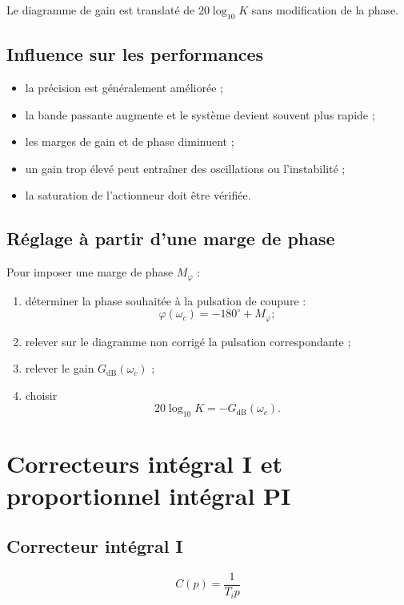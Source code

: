 \TLBodeCorrecteurP[10]

Le diagramme de gain est translaté de $20\log_{10}K$ sans modification de la
phase.

\subsection{Influence sur les performances}

\begin{itemize}
  \item la précision est généralement améliorée ;
  \item la bande passante augmente et le système devient souvent plus rapide ;
  \item les marges de gain et de phase diminuent ;
  \item un gain trop élevé peut entraîner des oscillations ou l'instabilité ;
  \item la saturation de l'actionneur doit être vérifiée.
\end{itemize}

\subsection{Réglage à partir d'une marge de phase}

Pour imposer une marge de phase $M_\varphi$ :
\begin{enumerate}
  \item déterminer la phase souhaitée à la pulsation de coupure :
  \[
  \varphi(\omega_c)=-180^\circ+M_\varphi ;
  \]
  \item relever sur le diagramme non corrigé la pulsation correspondante ;
  \item relever le gain $G_{\mathrm{dB}}(\omega_c)$ ;
  \item choisir
  \[
  20\log_{10}K=-G_{\mathrm{dB}}(\omega_c).
  \]
\end{enumerate}

\section{Correcteurs intégral I et proportionnel intégral PI}\label{sec:corr-pi}

\subsection{Correcteur intégral I}

\[
\boxed{C(p)=\frac{1}{T_i p}}
\]

